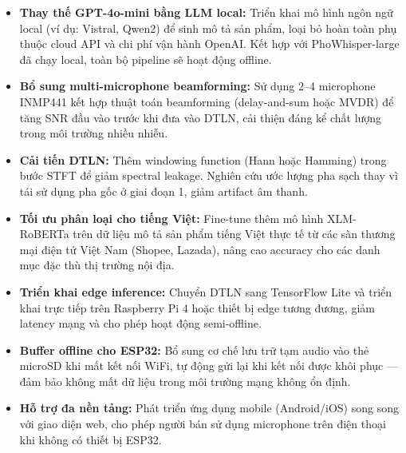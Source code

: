 \begin{itemize}
\item \textbf{Thay thế GPT-4o-mini bằng LLM local:} Triển khai mô hình ngôn ngữ
  local (ví dụ: Vistral, Qwen2) để sinh mô tả sản phẩm, loại bỏ hoàn toàn
  phụ thuộc cloud API và chi phí vận hành OpenAI. Kết hợp với PhoWhisper-large
  đã chạy local, toàn bộ pipeline sẽ hoạt động offline.

\item \textbf{Bổ sung multi-microphone beamforming:} Sử dụng 2--4 microphone
  INMP441 kết hợp thuật toán beamforming (delay-and-sum hoặc MVDR) để tăng
  SNR đầu vào trước khi đưa vào DTLN, cải thiện đáng kể chất lượng trong
  môi trường nhiều nhiễu.

\item \textbf{Cải tiến DTLN:} Thêm windowing function (Hann hoặc Hamming)
  trong bước STFT để giảm spectral leakage. Nghiên cứu ước lượng pha sạch
  thay vì tái sử dụng pha gốc ở giai đoạn 1, giảm artifact âm thanh.

\item \textbf{Tối ưu phân loại cho tiếng Việt:} Fine-tune thêm mô hình
  XLM-RoBERTa trên dữ liệu mô tả sản phẩm tiếng Việt thực tế từ các
  sàn thương mại điện tử Việt Nam (Shopee, Lazada), nâng cao accuracy
  cho các danh mục đặc thù thị trường nội địa.

\item \textbf{Triển khai edge inference:} Chuyển DTLN sang TensorFlow Lite
  và triển khai trực tiếp trên Raspberry Pi 4 hoặc thiết bị edge tương
  đương, giảm latency mạng và cho phép hoạt động semi-offline.

\item \textbf{Buffer offline cho ESP32:} Bổ sung cơ chế lưu trữ tạm audio
  vào thẻ microSD khi mất kết nối WiFi, tự động gửi lại khi kết nối được
  khôi phục --- đảm bảo không mất dữ liệu trong môi trường mạng không ổn định.

\item \textbf{Hỗ trợ đa nền tảng:} Phát triển ứng dụng mobile (Android/iOS)
  song song với giao diện web, cho phép người bán sử dụng microphone trên
  điện thoại khi không có thiết bị ESP32.
\end{itemize}
